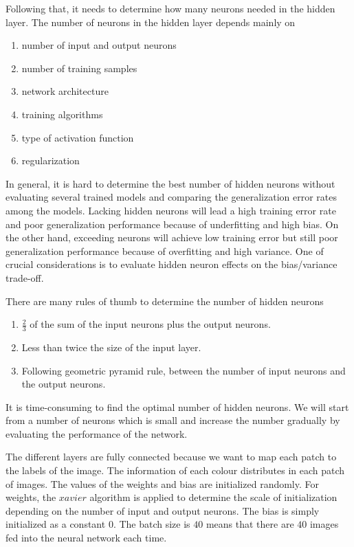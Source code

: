 Following that, it needs to determine how many neurons needed in the hidden layer. The number of neurons in the hidden layer depends mainly on
\begin{enumerate}
  \item number of input and output neurons
  \item number of training samples
  \item network architecture
  \item training algorithms
  \item type of activation function
  \item regularization
\end{enumerate}
In general, it is hard to determine the best number of hidden neurons without evaluating several trained models and comparing the generalization error rates among the models. Lacking hidden neurons will lead a high training error rate and poor generalization performance because of underfitting and high bias. On the other hand, exceeding neurons will achieve low training error but still poor generalization performance because of overfitting and high variance. One of crucial considerations is to evaluate hidden neuron effects on the bias/variance trade-off.

There are many rules of thumb to determine the number of hidden neurons \citep{heaton2008introduction}
\begin{enumerate}
  \item $\frac{2}{3}$ of the sum of the input neurons plus the output neurons.
  \item Less than twice the size of the input layer.
  \item Following geometric pyramid rule, between the number of input neurons and the output neurons.
\end{enumerate}
It is time-consuming to find the optimal number of hidden neurons. We will start from a number of neurons which is small and increase the number gradually by evaluating the performance of the network.

The different layers are fully connected because we want to map each patch to the labels of the image. The information of each colour distributes in each patch of images. The values of the weights and bias are initialized randomly. For weights, the $xavier$ algorithm is applied to determine the scale of initialization depending on the number of input and output neurons. The bias is simply initialized as a constant $0$. The batch size is $40$ means that there are $40$ images fed into the neural network each time.

